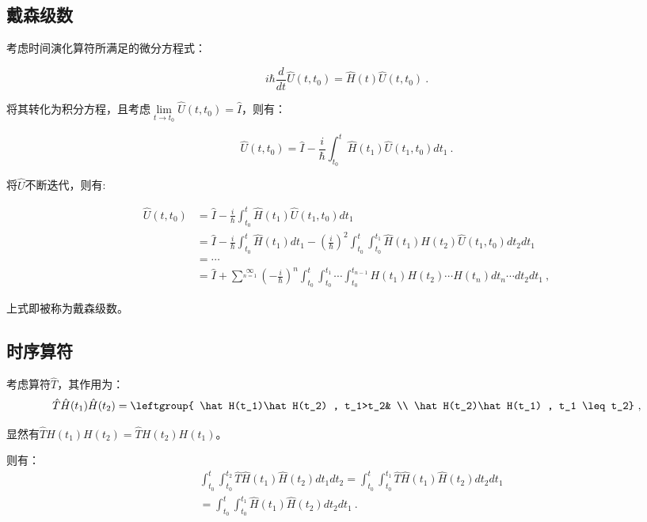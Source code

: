 

\subsection{戴森级数}

考虑时间演化算符所满足的微分方程式：

\begin{equation}
i\hbar \frac{d}{dt}\hat U (t,t_0) = \hat H(t) \hat U (t,t_0)~.
\end{equation}

将其转化为积分方程，且考虑$\lim\limits_{t\rightarrow t_0}\hat U(t,t_0)=\hat I$，则有：

\begin{equation}
\hat U (t,t_0) =\hat I - \frac{i}{\hbar}\int^t_{t_0} \hat H(t_1) \hat U (t_1,t_0)dt_1~.
\end{equation}

将$\hat{U}$不断迭代，则有:

\begin{align}
\hat U (t,t_0) &=\hat I - \frac{i}{\hbar}\int^t_{t_0} \hat H(t_1) \hat U (t_1,t_0)dt_1 \\
&=\hat I - \frac{i}{\hbar}\int^t_{t_0} \hat H(t_1) dt_1 - (\frac{i}{\hbar})^2\int^t_{t_0}\int^{t_1}_{t_0} \hat H(t_1)H(t_2) \hat U (t_1,t_0)dt_2 dt_1 \\
&= \cdots \\
&=\hat I +\sum\limits^{\infty}\limits_{n=1}(-\frac{i}{\hbar})^n\int^{t}_{t_0}\int^{t_1}_{t_0}\cdots\int^{t_{n-1}}_{t_0}H(t_1)H(t_2)\cdots H(t_n)dt_n\cdots dt_2dt_1 ~,
\end{align}

上式即被称为戴森级数。

\subsection{时序算符}

考虑算符$\hat T$，其作用为：
$$\hat T\hat H(t_1)\hat H(t_2)=\leftgroup{  
\hat H(t_1)\hat H(t_2) , t_1>t_2&  \\  
\hat H(t_2)\hat H(t_1) , t_1 \leq t_2}~,
$$

显然有$\hat TH(t_1)H(t_2)=\hat TH(t_2)H(t_1)$。

则有：
\begin{equation}
\begin{aligned}
&\int^t_{t_0}\int^{t_2}_{t_0}\hat T\hat H(t_1)\hat H(t_2)dt_1dt_2
=\int^t_{t_0}\int^{t_1}_{t_0}\hat T\hat H(t_1)\hat H(t_2)dt_2dt_1\\
&= \int^t_{t_0}\int^{t_1}_{t_0}\hat H(t_1)\hat H(t_2)dt_2dt_1~.
\end{aligned}
\end{equation}

